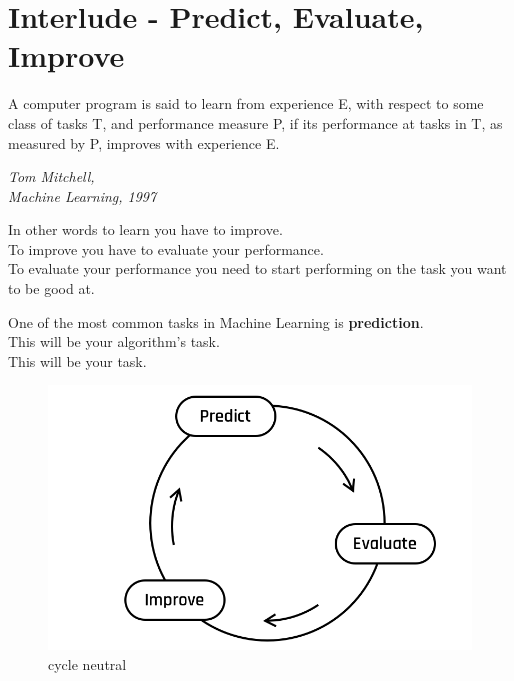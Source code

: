 
\section*{Interlude - Predict, Evaluate, Improve}

\epigraph
{A computer program is said to learn from experience E, with respect to some
class of tasks T, and performance measure P, if its performance at tasks in T,
as measured by P, improves with experience E.}{\textit{Tom Mitchell,\\Machine Learning, 1997}}

\begin{quote}{}

\end{quote}

In other words to learn you have to improve.\\
To improve you have to evaluate your performance.\\
To evaluate your performance you need to start performing on the task you want to be good at.


One of the most common tasks in Machine Learning is \textbf{prediction}.\\  
This will be your algorithm's task.\\
This will be your task.  

\begin{figure}[h!]
  \centering
  \includegraphics[scale=0.25]{assets/Default.png}
  \caption{cycle neutral}
\end{figure}

